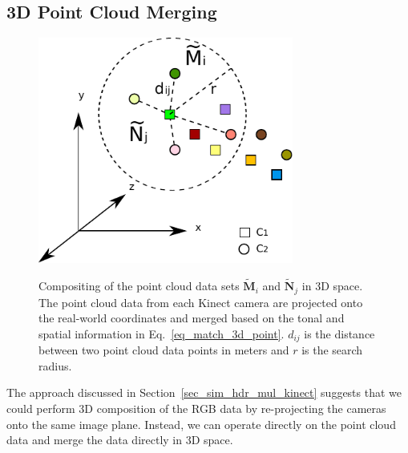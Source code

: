 \subsection{3D Point Cloud Merging}
\begin{figure}
\centering
\includegraphics[width=3.3in]{ch4/diagrams/3d_data_structure.pdf} \\
\caption{Compositing of the point cloud data sets $\mathbf{\tilde{M}}_i$ and $\mathbf{\tilde{N}}_j$ in 3D space. The point cloud data from each Kinect camera are projected onto the real-world coordinates and merged based on the tonal and spatial information in Eq.~\ref{eq_match_3d_point}. $d_{ij}$ is the distance between two point cloud data points in meters and $r$ is the search radius.}
\label{fig_3D_structure}
\end{figure}
The approach discussed in Section~\ref{sec_sim_hdr_mul_kinect} suggests that we could perform 3D composition of the RGB data by re-projecting the cameras onto the same image plane. Instead, we can operate directly on the point cloud data and merge the data directly in 3D space.

